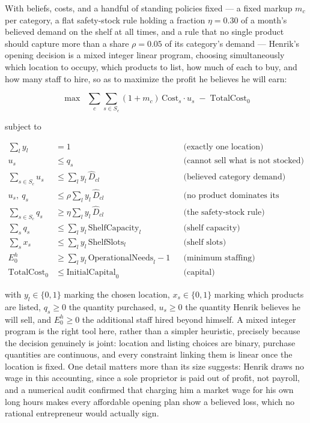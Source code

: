 \documentclass[12pt,a4paper]{article}
\begin{document}
With beliefs, costs, and a handful of standing policies fixed --- a fixed
markup $m_c$ per category, a flat safety-stock rule holding a fraction
$\eta = 0.30$ of a month's believed demand on the shelf at all times, and
a rule that no single product should capture more than a share $\rho =
0.05$ of its category's demand --- Henrik's opening decision is a mixed
integer linear program, choosing simultaneously which location to
occupy, which products to list, how much of each to buy, and how many
staff to hire, so as to maximize the profit he believes he will earn:

\[
\max \;\; \sum_{c}\sum_{s \in S_c} (1+m_c)\,\text{Cost}_s \cdot u_s \;-\;
\text{TotalCost}_0
\]

subject to

\[
\begin{aligned}
\sum_l y_l &= 1 && \text{(exactly one location)} \\
u_s &\leq q_s && \text{(cannot sell what is not stocked)} \\
\sum_{s \in S_c} u_s &\leq \sum_l y_l\,\hat{D}_{cl} && \text{(believed category demand)} \\
u_s,\ q_s &\leq \rho \sum_l y_l\,\hat{D}_{cl} && \text{(no product dominates its category)} \\
\sum_{s \in S_c} q_s &\geq \eta \sum_l y_l\,\hat{D}_{cl} && \text{(the safety-stock rule)} \\
\sum_s q_s &\leq \sum_l y_l\,\text{ShelfCapacity}_l && \text{(shelf capacity)} \\
\sum_s x_s &\leq \sum_l y_l\,\text{ShelfSlots}_l && \text{(shelf slots)} \\
E^h_0 &\geq \sum_l y_l\,\text{OperationalNeeds}_l - 1 && \text{(minimum staffing)} \\
\text{TotalCost}_0 &\leq \text{InitialCapital}_0 && \text{(capital)}
\end{aligned}
\]

with $y_l \in \{0,1\}$ marking the chosen location, $x_s \in \{0,1\}$
marking which products are listed, $q_s \geq 0$ the quantity purchased,
$u_s \geq 0$ the quantity Henrik believes he will sell, and $E^h_0 \geq
0$ the additional staff hired beyond himself. A mixed integer program is
the right tool here, rather than a simpler heuristic, precisely because
the decision genuinely is joint: location and listing choices are
binary, purchase quantities are continuous, and every constraint linking
them is linear once the location is fixed. One detail matters more than
its size suggests: Henrik draws no wage in this accounting, since a sole
proprietor is paid out of profit, not payroll, and a numerical audit
confirmed that charging him a market wage for his own long hours makes
every affordable opening plan show a believed loss, which no rational
entrepreneur would actually sign.
\end{document}
